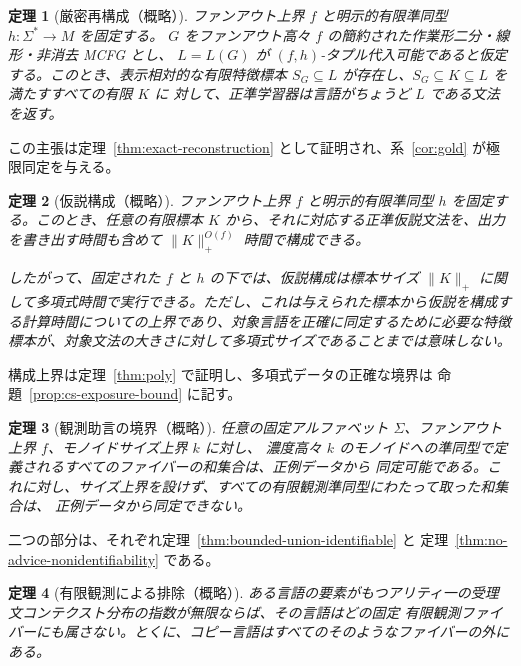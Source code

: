 \documentclass[11pt,a4paper]{ltjsarticle}
\newtheorem{theorem}{定理}[section]
\theoremstyle{remark}
\begin{document}
\begin{theorem}[厳密再構成（概略）]
\label{thm:main-exact-preview}
ファンアウト上界 \(f\) と明示的有限準同型 \(h:\Sigma^*\to M\) を固定する。
\(G\) をファンアウト高々 \(f\) の簡約された作業形二分・線形・非消去 MCFG とし、
\(L=L(G)\) が \((f,h)\)-タプル代入可能であると仮定する。このとき、表示相対的な有限特徴標本
\(S_G\subseteq L\) が存在し、\(S_G\subseteq K\subseteq L\) を満たすすべての有限 \(K\) に
対して、正準学習器は言語がちょうど \(L\) である文法を返す。
\end{theorem}

この主張は定理~\ref{thm:exact-reconstruction} として証明され、系~\ref{cor:gold} が極限同定を与える。

\begin{theorem}[仮説構成（概略）]
\label{thm:main-poly-preview}
ファンアウト上界 $f$ と明示的有限準同型 $h$ を固定する。このとき、任意の有限標本 $K$ から、それに対応する正準仮説文法を、出力を書き出す時間も含めて $\|K\|_+^{O(f)}$ 時間で構成できる。

したがって、固定された $f$ と $h$ の下では、仮説構成は標本サイズ $\|K\|_+$ に関して多項式時間で実行できる。ただし、これは与えられた標本から仮説を構成する計算時間についての上界であり、対象言語を正確に同定するために必要な特徴標本が、対象文法の大きさに対して多項式サイズであることまでは意味しない。
\end{theorem}


構成上界は定理~\ref{thm:poly} で証明し、多項式データの正確な境界は
命題~\ref{prop:cs-exposure-bound} に記す。

\begin{theorem}[観測助言の境界（概略）]
\label{thm:main-advice-preview}
任意の固定アルファベット \(\Sigma\)、ファンアウト上界 \(f\)、モノイドサイズ上界 \(k\) に対し、
濃度高々 \(k\) のモノイドへの準同型で定義されるすべてのファイバーの和集合は、正例データから
同定可能である。これに対し、サイズ上界を設けず、すべての有限観測準同型にわたって取った和集合は、
正例データから同定できない。
\end{theorem}

二つの部分は、それぞれ定理~\ref{thm:bounded-union-identifiable} と
定理~\ref{thm:no-advice-nonidentifiability} である。

\begin{theorem}[有限観測による排除（概略）]
\label{thm:main-exclusion-preview}
ある言語の要素がもつアリティ一の受理文コンテクスト分布の指数が無限ならば、その言語はどの固定
有限観測ファイバーにも属さない。とくに、コピー言語はすべてのそのようなファイバーの外にある。
\end{theorem}
\end{document}
